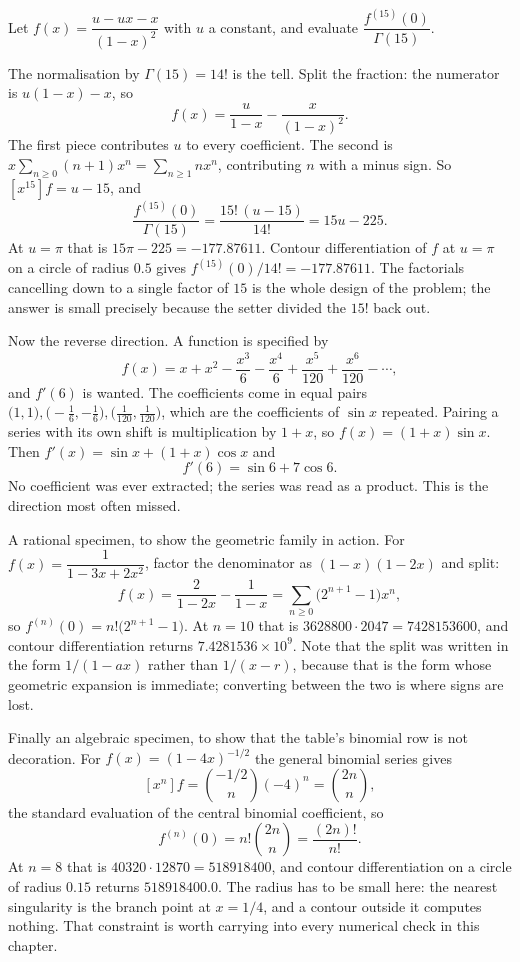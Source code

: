\begin{worked}
Let $f(x)=\dfrac{u-ux-x}{(1-x)^{2}}$ with $u$ a constant, and evaluate $\dfrac{f^{(15)}(0)}{\Gamma(15)}$.

The normalisation by $\Gamma(15)=14!$ is the tell. Split the fraction: the numerator is $u(1-x)-x$, so
\[
f(x)=\frac{u}{1-x}-\frac{x}{(1-x)^{2}} .
\]
The first piece contributes $u$ to every coefficient. The second is $x\sum_{n\geq0}(n+1)x^{n}=\sum_{n\geq1}nx^{n}$, contributing $n$ with a minus sign. So $[x^{15}]f=u-15$, and
\[
\frac{f^{(15)}(0)}{\Gamma(15)}=\frac{15!\,(u-15)}{14!}=15u-225 .
\]
At $u=\pi$ that is $15\pi-225=-177.87611$. Contour differentiation of $f$ at $u=\pi$ on a circle of radius $0.5$ gives $f^{(15)}(0)/14!=-177.87611$. The factorials cancelling down to a single factor of $15$ is the whole design of the problem; the answer is small precisely because the setter divided the $15!$ back out.

Now the reverse direction. A function is specified by
\[
f(x)=x+x^{2}-\frac{x^{3}}{6}-\frac{x^{4}}{6}+\frac{x^{5}}{120}+\frac{x^{6}}{120}-\cdots ,
\]
and $f'(6)$ is wanted. The coefficients come in equal pairs $\bigl(1,1\bigr),\bigl(-\tfrac16,-\tfrac16\bigr),\bigl(\tfrac1{120},\tfrac1{120}\bigr)$, which are the coefficients of $\sin x$ repeated. Pairing a series with its own shift is multiplication by $1+x$, so $f(x)=(1+x)\sin x$. Then $f'(x)=\sin x+(1+x)\cos x$ and
\[
f'(6)=\sin6+7\cos6 .
\]
No coefficient was ever extracted; the series was read as a product. This is the direction most often missed.

A rational specimen, to show the geometric family in action. For $f(x)=\dfrac{1}{1-3x+2x^{2}}$, factor the denominator as $(1-x)(1-2x)$ and split:
\[
f(x)=\frac{2}{1-2x}-\frac{1}{1-x}=\sum_{n\geq0}\bigl(2^{n+1}-1\bigr)x^{n},
\]
so $f^{(n)}(0)=n!\bigl(2^{n+1}-1\bigr)$. At $n=10$ that is $3628800\cdot2047=7428153600$, and contour differentiation returns $7.4281536\times10^{9}$. Note that the split was written in the form $1/(1-ax)$ rather than $1/(x-r)$, because that is the form whose geometric expansion is immediate; converting between the two is where signs are lost.

Finally an algebraic specimen, to show that the table's binomial row is not decoration. For $f(x)=(1-4x)^{-1/2}$ the general binomial series gives
\[
[x^{n}]f=\binom{-1/2}{n}(-4)^{n}=\binom{2n}{n},
\]
the standard evaluation of the central binomial coefficient, so
\[
f^{(n)}(0)=n!\binom{2n}{n}=\frac{(2n)!}{n!} .
\]
At $n=8$ that is $40320\cdot12870=518918400$, and contour differentiation on a circle of radius $0.15$ returns $518918400.0$. The radius has to be small here: the nearest singularity is the branch point at $x=1/4$, and a contour outside it computes nothing. That constraint is worth carrying into every numerical check in this chapter.
\end{worked}


